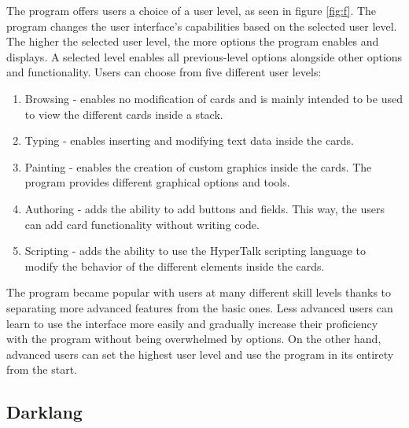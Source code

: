 The program offers users a choice of a user level, as seen in figure \ref{fig:f}. The program changes the user interface's capabilities based on the selected user level.
The higher the selected user level, the more options the program enables and displays. A selected level enables all previous-level options alongside other options and functionality.
Users can choose from five different user levels:
\begin{enumerate}
	\item Browsing - enables no modification of cards and is mainly intended to be used to view the different cards inside a stack.
	\item Typing - enables inserting and modifying text data inside the cards.
	\item Painting - enables the creation of custom graphics inside the cards. The program provides different graphical options and tools.
	\item Authoring - adds the ability to add buttons and fields. This way, the users can add card functionality without writing code.
	\item Scripting - adds the ability to use the HyperTalk scripting language to modify the behavior of the different elements inside the cards.
\end{enumerate}



The program became popular with users at many different skill levels thanks to separating more advanced features from the basic ones.
Less advanced users can learn to use the interface more easily and gradually increase their proficiency with the program without being overwhelmed by options.
On the other hand, advanced users can set the highest user level and use the program in its entirety from the start.


\subsection{Darklang}

